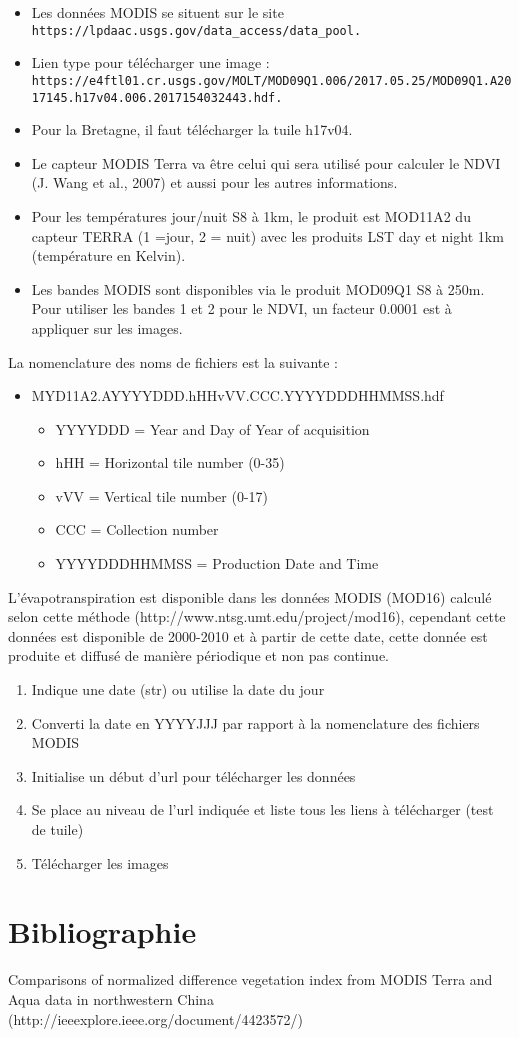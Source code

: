 \documentclass[10pt,a4paper]{article}
\begin{document}
\begin{itemize}
\item Les données MODIS se situent sur le site \verb!https://lpdaac.usgs.gov/data_access/data_pool.!
\item Lien type pour télécharger une image : \verb!https://e4ftl01.cr.usgs.gov/MOLT/MOD09Q1.006/2017.05.25/MOD09Q1.A2017145.h17v04.006.2017154032443.hdf.!
\item Pour la Bretagne, il faut télécharger la tuile h17v04. 
\item Le capteur MODIS Terra va être celui qui sera utilisé pour calculer le NDVI (J. Wang et al., 2007) et aussi pour les autres informations.
\item Pour les températures jour/nuit S8 à 1km, le produit est MOD11A2 du capteur TERRA (1 =jour, 2 = nuit) avec les produits LST day et night 1km (température en Kelvin).
\item Les bandes MODIS sont disponibles via le produit MOD09Q1 S8 à 250m. Pour utiliser les bandes 1 et 2 pour le NDVI, un facteur 0.0001 est à appliquer sur les images.
\end{itemize}  

La nomenclature des noms de fichiers est la suivante :
\begin{itemize}
\item MYD11A2.AYYYYDDD.hHHvVV.CCC.YYYYDDDHHMMSS.hdf
\begin{itemize}
\item YYYYDDD = Year and Day of Year of acquisition
\item hHH = Horizontal tile number (0-35)
\item vVV = Vertical tile number (0-17)
\item CCC = Collection number
\item YYYYDDDHHMMSS = Production Date and Time
\end{itemize}
\end{itemize}

L'évapotranspiration est disponible dans les données MODIS (MOD16) calculé selon cette méthode (http://www.ntsg.umt.edu/project/mod16), cependant cette données est disponible de 2000-2010 et à partir de cette date, cette donnée est produite et diffusé de manière périodique et non pas continue.

\begin{enumerate}
\item Indique une date (str) ou utilise la date du jour
\item Converti la date en YYYYJJJ par rapport à la nomenclature des fichiers MODIS
\item Initialise un début d'url pour télécharger les données
\item Se place au niveau de l'url indiquée et liste tous les liens à télécharger (test de tuile)
\item Télécharger les images
\end{enumerate}

\section{Bibliographie}

Comparisons of normalized difference vegetation index from MODIS Terra and Aqua data in northwestern China (http://ieeexplore.ieee.org/document/4423572/)
\end{document}
